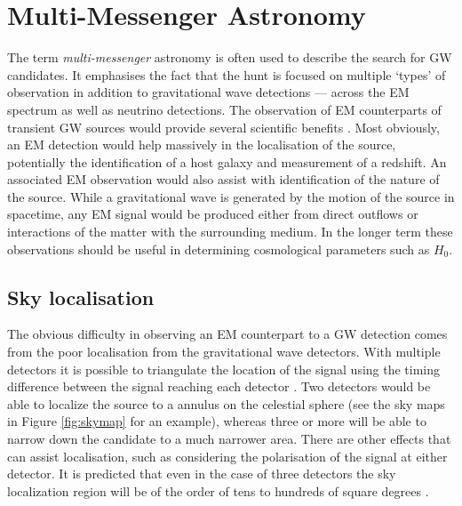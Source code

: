 \section{Multi-Messenger Astronomy}
\label{sec:multi}
\begin{colsection}


\begin{colsection}


The term \emph{multi-messenger} astronomy is often used to describe the search for GW candidates. It emphasises the fact that the hunt is focused on multiple `types' of observation in addition to gravitational wave detections --- across the EM spectrum as well as neutrino detections. The observation of EM counterparts of transient GW sources would provide several scientific benefits \citep{LIGO-EM, LIGO-firstrun-2012}. Most obviously, an EM detection would help massively in the localisation of the source, potentially the identification of a host galaxy and measurement of a redshift. An associated EM observation would also assist with identification of the nature of the source. While a gravitational wave is generated by the motion of the source in spacetime, any EM signal would be produced either from direct outflows or interactions of the matter with the surrounding medium. In the longer term these observations should be useful in determining cosmological parameters such as $H_0$.

\end{colsection}


\subsection{Sky localisation}
\label{sec:localisation}
\begin{colsection}


The obvious difficulty in observing an EM counterpart to a GW detection comes from the poor localisation from the gravitational wave detectors. With multiple detectors it is possible to triangulate the location of the signal using the timing difference between the signal reaching each detector \citep{LIGO-localization,LIGO-localization2}. Two detectors would be able to localize the source to a annulus on the celestial sphere (see the sky maps in Figure \ref{fig:skymap} for an example), whereas three or more will be able to narrow down the candidate to a much narrower area. There are other effects that can assist localisation, such as considering the polarisation of the signal at either detector. It is predicted that even in the case of three detectors the sky localization region will be of the order of tens to hundreds of square degrees \citep{LIGO-prospects}.


\end{colsection}
\end{colsection}
